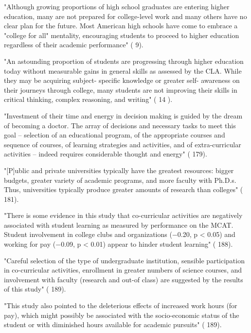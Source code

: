 
"Although growing proportions of high school graduates are entering higher education, many are not prepared for college-level work and many others have no clear plan for the future. Most American high schools have come to embrace a "college for all" mentality, encouraging students to proceed to higher education regardless of their academic performance" (\cite{Arum-2011} 9).


"An astounding proportion of students are progressing through higher education today without measurable gains in general skills as assessed by the CLA. While they may be acquiring subject- specific knowledge or greater self- awareness on their journeys through college, many students are not improving their skills in critical thinking, complex reasoning, and writing" (\cite{Arum-2011} 14 ).


"Investment of their time and energy in decision making is guided by the dream of becoming a doctor. The array of decisions and necessary tasks to meet this goal – selection of an educational program, of the appropriate courses and sequence of courses, of learning strategies and activities, and of extra-curricular activities – indeed requires considerable thought and energy" (\cite{Anaya-2001} 179).

"[P]ublic and private universities typically have the greatest resources: bigger budgets, greater variety of academic programs, and more faculty with Ph.D.s. Thus, universities typically produce greater amounts of research than colleges" (\cite{Anaya-2001} 181).

"There is some evidence in this study that co-curricular activities are negatively associated with student learning as measured by performance on the MCAT. Student involvement in college clubs and organizations (−0.20, p < 0.05) and working for pay (−0.09, p < 0.01) appear to hinder student learning" (\cite{Anaya-2001} 188).

"Careful selection of the type of undergraduate institution, sensible participation in co-curricular activities, enrollment in greater numbers of science courses, and involvement with faculty (research and out-of class) are suggested by the results of this study" (\cite{Anaya-2001} 189).

"This study also pointed to the deleterious effects of increased work hours (for pay), which might possibly be associated with the socio-economic status of the student or with diminished hours available for academic pursuits" (\cite{Anaya-2001} 189).


